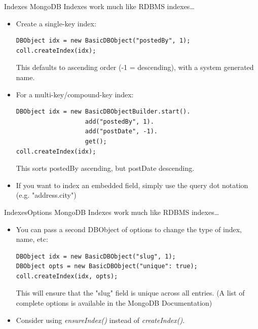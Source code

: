 \documentclass{beamer}
\begin{document}
\begin{frame}[fragile]{Indexes}
    \small MongoDB Indexes work much like RDBMS indexes\ldots
    \begin{itemize}
        \item Create a single-key index:\\ 
\begin{lstlisting}
DBObject idx = new BasicDBObject("postedBy", 1);
coll.createIndex(idx);
\end{lstlisting}
        This defaults to ascending order (-1 = descending), with a system generated name.
        \item For a multi-key/compound-key index:
            \begin{lstlisting}
DBObject idx = new BasicDBObjectBuilder.start().
                   add("postedBy", 1).
                   add("postDate", -1).
                   get();
coll.createIndex(idx);
\end{lstlisting}
        This sorts postedBy ascending, but postDate descending.

    \item If you want to index an embedded field, simply use the query dot notation (e.g. "address.city")
        
    \end{itemize}
\end{frame}

\begin{frame}[fragile]{Indexes}{Options}
    \small MongoDB Indexes work much like RDBMS indexes\ldots
    \begin{itemize}
    \item You can pass a second DBObject of options to change the type of index, name, etc:
\begin{lstlisting}
DBObject idx = new BasicDBObject("slug", 1);
DBObject opts = new BasicDBObject("unique": true);
coll.createIndex(idx, opts);
\end{lstlisting}
            This will ensure that the "slug" field is unique across all entries.  (A list of complete options is available in the MongoDB Documentation)
        \item Consider using {\em ensureIndex()} instead of {\em createIndex()}.
    \end{itemize}
\end{frame}
\end{document}
